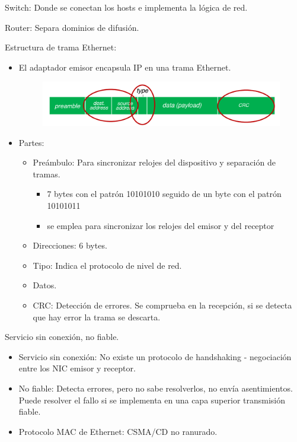\documentclass[12pt, twoside, openright]{report} %
\begin{document}
      Switch: Donde se conectan los hosts e implementa la lógica de red.

      Router: Separa dominios de difusión.

      Estructura de trama Ethernet:
      \begin{itemize}
        \item El adaptador emisor encapsula IP en una trama Ethernet.
        \begin{figure}[H]
          {\includegraphics[scale=.25]{Untitled 58.png}}
        \end{figure}
        \pagebreak
        \item Partes:
        \begin{itemize}
         \item Preámbulo: Para sincronizar relojes del dispositivo y separación de tramas.
          \begin{itemize}
           \item 7 bytes con el patrón 10101010 seguido de un byte con el patrón 10101011
         \item se emplea para sincronizar los relojes del emisor y del receptor
          \end{itemize}
          
        \item Direcciones: 6 bytes.
        \item Tipo: Indica el protocolo de nivel de red.
        \item Datos.
        \item CRC: Detección de errores. Se comprueba en la recepción, si se detecta que hay error la trama se descarta.
        \end{itemize}
      
      \end{itemize}
  
  
      Servicio sin conexión, no fiable.

      \begin{itemize}
      \item
        Servicio sin conexión: No existe un protocolo de handshaking -
        negociación entre los NIC emisor y receptor.
      \item
        No fiable: Detecta errores, pero no sabe resolverlos, no envía
        asentimientos. Puede resolver el fallo si se implementa en una
        capa superior transmisión fiable.
      \item
        Protocolo MAC de Ethernet: CSMA/CD no ranurado.
      \end{itemize}
    
\end{document}
